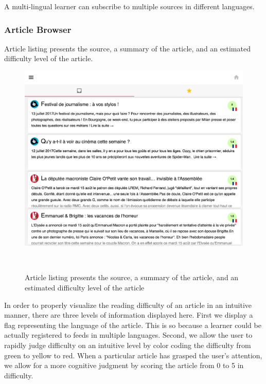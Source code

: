 A multi-lingual learner can subscribe to multiple sources in different languages. 

\subsubsection{Article Browser}

Article listing presents the source, a summary of the article, and an estimated difficulty level of the article.

    \begin{figure}[h!]
    \centering
      \includegraphics[width=0.95\columnwidth]{figures/article_listing}
      \caption{Article listing presents the source, a summary of the article, and an estimated difficulty level of the article }~
      \label{fig:registrations}
    \end{figure}


In order to properly visualize the reading difficulty of an article in an intuitive manner, there are three levels of information displayed here. First we display a flag representing the language of the article. This is so because a learner could be actually registered to feeds in multiple languages. Second, we allow the user to rapidly judge difficulty on an intuitive level by color coding the difficulty from green to yellow to red. When a particular article has grasped the user's attention, we allow for a more cognitive judgment by scoring the article from 0 to 5 in difficulty.




